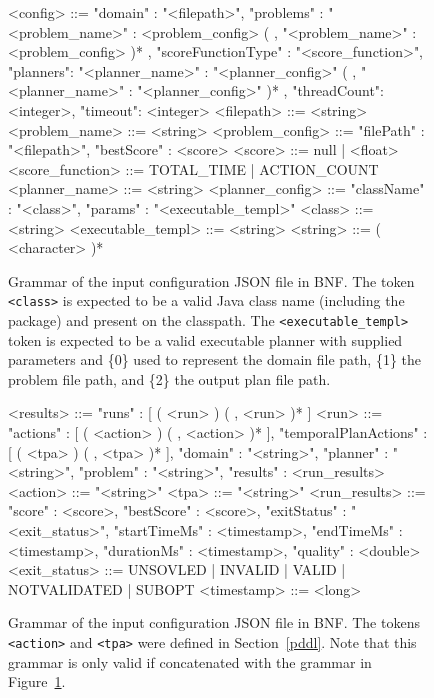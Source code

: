 \begin{figure}[tbp]
\centering
\begin{code}
<config> ::= { "domain" : "<filepath>",
               "problems" : { "<problem_name>" : <problem_config>
                          ( , "<problem_name>" : <problem_config> )* },
               "scoreFunctionType"  : "<score_function>",
               "planners": { "<planner_name>" : "<planner_config>"
                        ( , "<planner_name>" : "<planner_config>" )* },
               "threadCount": <integer>,
               "timeout": <integer> }
<filepath> ::= <string>
<problem_name> ::= <string>
<problem_config> ::= { "filePath" : "<filepath>",
                       "bestScore" : <score> }
<score> ::= null | <float>
<score_function> ::= TOTAL_TIME | ACTION_COUNT
<planner_name> ::= <string>
<planner_config> ::= { "className" : "<class>",
                       "params" : "<executable_templ>" }
<class> ::= <string>
<executable_templ> ::= <string>
<string> ::= ( <character> )*
\end{code}
\caption[Grammar of the input configuration JSON file in BNF.]{Grammar of the input configuration JSON file in BNF. The token \texttt{<class>}
is expected to be a valid Java class name (including the package) and present on the classpath.
The \texttt{<executable\_templ>} token is expected to be a valid executable planner with supplied parameters
and \{0\} used to represent the domain file path, \{1\} the problem file path, and \{2\} the output plan file path.}
\label{code:benchmark-config-bnf}
\end{figure}

\begin{figure}[tbp]
\centering
\begin{code}
<results> ::= { "runs" : [ ( <run> ) ( , <run> )* ] }
<run> ::= { "actions" : [ ( <action> ) ( , <action> )* ],
            "temporalPlanActions" : [ ( <tpa> ) ( , <tpa> )* ],
            "domain" : "<string>",
            "planner" : "<string>",
            "problem" : "<string>",
            "results" : <run_results> }
<action> ::= "<string>"
<tpa> ::= "<string>"
<run_results> ::= { "score" : <score>,
                    "bestScore" : <score>,
                    "exitStatus" : "<exit_status>",
                    "startTimeMs" : <timestamp>,
                    "endTimeMs" : <timestamp>,
                    "durationMs" : <timestamp>,
                    "quality" : <double> }
<exit_status> ::= UNSOVLED | INVALID | VALID | NOTVALIDATED | SUBOPT
<timestamp> ::= <long>
\end{code}
\caption[Grammar of the input configuration JSON file in BNF.]{Grammar of the input configuration JSON file in BNF.
The tokens \texttt{<action>} and \texttt{<tpa>} were defined in Section~\ref{pddl}. Note
that this grammar is only valid if concatenated with the grammar in Figure~\ref{code:benchmark-config-bnf}.}
\label{code:benchmark-results-bnf}
\end{figure}





